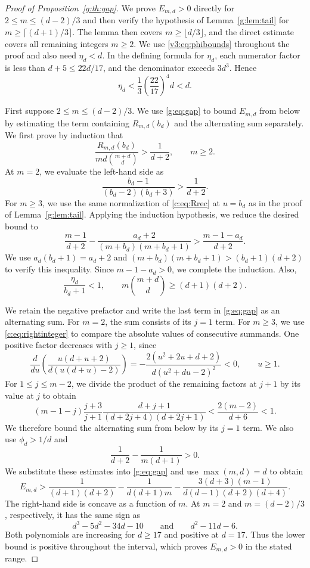 \documentclass[11pt]{article}
\numberwithin{equation}{section}
\theoremstyle{remark}\newtheorem{remark}[theorem]{Remark}
\begin{document}
\begin{proof}[Proof of Proposition~\ref{g:th:gap}]
We prove $E_{m,d}>0$ directly for $2\le m\le(d-2)/3$ and then verify
the hypothesis of Lemma~\ref{g:lem:tail} for $m\ge\lceil(d+1)/3\rceil$.
The lemma then covers $m\ge\lfloor d/3\rfloor$, and the direct estimate
covers all remaining integers $m\ge2$.
We use \eqref{v3:eq:phibounds} throughout the proof and also need $\eta_d<d$.
In the defining formula for $\eta_d$, each numerator factor is less
than $d+5\le22d/17$, and the denominator exceeds $3d^3$. Hence
\[
 \eta_d<\frac13\left(\frac{22}{17}\right)^4d<d.
\]

First suppose $2\le m\le(d-2)/3$.
We use \eqref{g:eq:gap} to bound $E_{m,d}$ from below by estimating
the term containing $R_{m,d}(b_d)$ and the alternating sum separately.
We first prove by induction that
\[
 \frac{R_{m,d}(b_d)}{md\binom{m+d}{d}}>\frac1{d+2},\qquad m\ge2.
\]
At $m=2$, we evaluate the left-hand side as
\[
 \frac{b_d-1}{(b_d-2)(b_d+3)}>\frac1{d+2}.
\]
For $m\ge3$, we use the same normalization of \eqref{c:eq:Rrec} at
$u=b_d$ as in the proof of Lemma~\ref{g:lem:tail}.
Applying the induction hypothesis, we reduce the desired bound to
\[
 \frac{m-1}{d+2}-\frac{a_d+2}{(m+b_d)(m+b_d+1)}
 >\frac{m-1-a_d}{d+2}.
\]
We use $a_d(b_d+1)=a_d+2$ and
$(m+b_d)(m+b_d+1)>(b_d+1)(d+2)$ to verify this inequality.
Since $m-1-a_d>0$, we complete the induction.
Also,
\[
 \frac{\eta_d}{b_d+1}<1,\qquad
 m\binom{m+d}{d}\ge(d+1)(d+2).
\]

We retain the negative prefactor and write the last term in
\eqref{g:eq:gap} as an alternating sum.
For $m=2$, the sum consists of its $j=1$ term.
For $m\ge3$, we use \eqref{c:eq:rightinteger} to compare the absolute
values of consecutive summands. One positive factor decreases with
$j\ge1$, since
\[
 \frac{d}{du}\left(\frac{u(d+u+2)}{d(u(d+u)-2)}\right)
 =-\frac{2(u^2+2u+d+2)}{d(u^2+du-2)^2}<0,\qquad u\ge1.
\]
For $1\le j\le m-2$, we divide the product of the remaining factors
at $j+1$ by its value at $j$ to obtain
\[
 (m-1-j)\frac{j+3}{j+1}
 \frac{d+j+1}{(d+2j+4)(d+2j+1)}
 <\frac{2(m-2)}{d+6}<1.
\]
We therefore bound the alternating sum from below by its $j=1$ term.
We also use $\phi_d>1/d$ and
\[
 \frac1{d+2}-\frac1{m(d+1)}>0.
\]
We substitute these estimates into \eqref{g:eq:gap} and use
$\max(m,d)=d$ to obtain
\[
 E_{m,d}>\frac1{(d+1)(d+2)}-\frac1{d(d+1)m}
 -\frac{3(d+3)(m-1)}{d(d-1)(d+2)(d+4)}.
\]
The right-hand side is concave as a function of $m$.
At $m=2$ and $m=(d-2)/3$, respectively, it has the same sign as
\[
 d^3-5d^2-34d-10
 \qquad\text{and}\qquad d^2-11d-6.
\]
Both polynomials are increasing for $d\ge17$ and positive at $d=17$.
Thus the lower bound is positive throughout the interval, which proves
$E_{m,d}>0$ in the stated range.


\end{proof}
\end{document}
